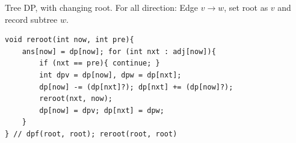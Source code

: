 Tree DP, with changing root. For all direction: Edge $v \rightarrow w$, set root as $v$ and record subtree $w$.

\begin{verbatim}
void reroot(int now, int pre){
	ans[now] = dp[now]; for (int nxt : adj[now]){
		if (nxt == pre){ continue; }
		int dpv = dp[now], dpw = dp[nxt];
		dp[now] -= (dp[nxt]?); dp[nxt] += (dp[now]?);
		reroot(nxt, now);
		dp[now] = dpv; dp[nxt] = dpw;
	}
} // dpf(root, root); reroot(root, root)
\end{verbatim}